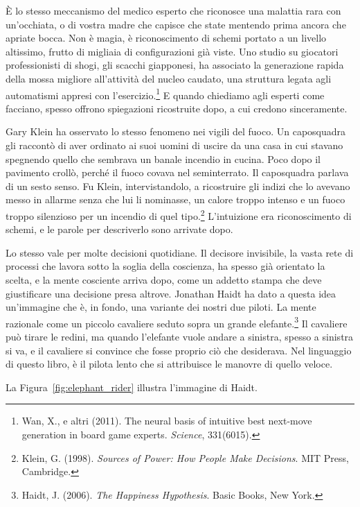 È lo stesso meccanismo del medico esperto che riconosce una malattia rara con un'occhiata, o di vostra madre che capisce che state mentendo prima ancora che apriate bocca. Non è magia, è riconoscimento di schemi portato a un livello altissimo, frutto di migliaia di configurazioni già viste. Uno studio su giocatori professionisti di shogi, gli scacchi giapponesi, ha associato la generazione rapida della mossa migliore all'attività del nucleo caudato, una struttura legata agli automatismi appresi con l'esercizio.\footnote{Wan, X., e altri (2011). The neural basis of intuitive best next-move generation in board game experts. \textit{Science}, 331(6015).} E quando chiediamo agli esperti come facciano, spesso offrono spiegazioni ricostruite dopo, a cui credono sinceramente.

Gary Klein ha osservato lo stesso fenomeno nei vigili del fuoco. Un caposquadra gli raccontò di aver ordinato ai suoi uomini di uscire da una casa in cui stavano spegnendo quello che sembrava un banale incendio in cucina. Poco dopo il pavimento crollò, perché il fuoco covava nel seminterrato. Il caposquadra parlava di un sesto senso. Fu Klein, intervistandolo, a ricostruire gli indizi che lo avevano messo in allarme senza che lui li nominasse, un calore troppo intenso e un fuoco troppo silenzioso per un incendio di quel tipo.\footnote{Klein, G. (1998). \textit{Sources of Power: How People Make Decisions}. MIT Press, Cambridge.} L'intuizione era riconoscimento di schemi, e le parole per descriverlo sono arrivate dopo.

Lo stesso vale per molte decisioni quotidiane. Il decisore invisibile, la vasta rete di processi che lavora sotto la soglia della coscienza, ha spesso già orientato la scelta, e la mente cosciente arriva dopo, come un addetto stampa che deve giustificare una decisione presa altrove. Jonathan Haidt ha dato a questa idea un'immagine che è, in fondo, una variante dei nostri due piloti. La mente razionale come un piccolo cavaliere seduto sopra un grande elefante.\footnote{Haidt, J. (2006). \textit{The Happiness Hypothesis}. Basic Books, New York.} Il cavaliere può tirare le redini, ma quando l'elefante vuole andare a sinistra, spesso a sinistra si va, e il cavaliere si convince che fosse proprio ciò che desiderava. Nel linguaggio di questo libro, è il pilota lento che si attribuisce le manovre di quello veloce.

La Figura~\ref{fig:elephant_rider} illustra l'immagine di Haidt.


